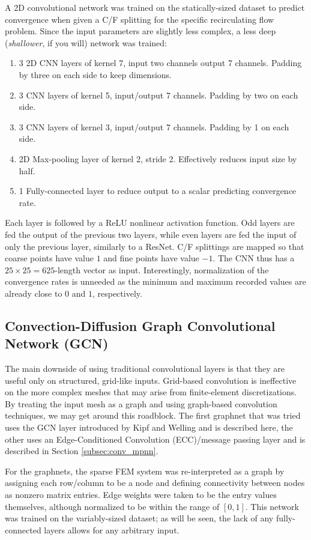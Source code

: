 \documentclass[review]{siamart190516}
\begin{document}
A 2D convolutional network was trained on the statically-sized dataset to predict convergence when given a C/F splitting for the specific recirculating flow problem.  Since the input parameters are slightly less complex, a less deep (\textit{shallower}, if you will) network was trained:
%
\begin{enumerate}
\item 3 2D CNN layers of kernel 7, input two channels output 7 channels.  Padding by three on each side to keep dimensions.
\item 3 CNN layers of kernel 5, input/output 7 channels.  Padding by two on each side.
\item 3 CNN layers of kernel 3, input/output 7 channels.  Padding by 1 on each side.
\item 2D Max-pooling layer of kernel 2, stride 2.  Effectively reduces input size by half.
\item 1 Fully-connected layer to reduce output to a scalar predicting convergence rate.
\end{enumerate}
%
Each layer is followed by a ReLU nonlinear activation function.  Odd layers are fed the output of the previous two layers, while even layers are fed the input of only the previous layer, similarly to a ResNet.  C/F splittings are mapped so that coarse points have value $1$ and fine points have value $-1$.  The CNN thus has a $25\times 25=625$-length vector as input.  Interestingly, normalization of the convergence rates is unneeded as the minimum and maximum recorded values are already close to $0$ and $1$, respectively.

\subsection{Convection-Diffusion Graph Convolutional Network (GCN)}\label{subsec:conv_gcn}

The main downside of using traditional convolutional layers is that they are useful only on structured, grid-like inputs.  Grid-based convolution is ineffective on the more complex meshes that may arise from finite-element discretizations.  By treating the input mesh as a graph and using graph-based convolution techniques, we may get around this roadblock.  The first graphnet that was tried uses the GCN layer introduced by Kipf and Welling\cite{gcn} and is described here, the other uses an Edge-Conditioned Convolution (ECC)/message passing layer and is described in Section \ref{subsec:conv_mpnn}.

For the graphnets, the sparse FEM system was re-interpreted as a graph by assigning each row/column to be a node and defining connectivity between nodes as nonzero matrix entries.  Edge weights were taken to be the entry values themselves, although normalized to be within the range of $[0, 1]$.   This network was trained on the variably-sized dataset; as will be seen, the lack of any fully-connected layers allows for any arbitrary input.
\end{document}
